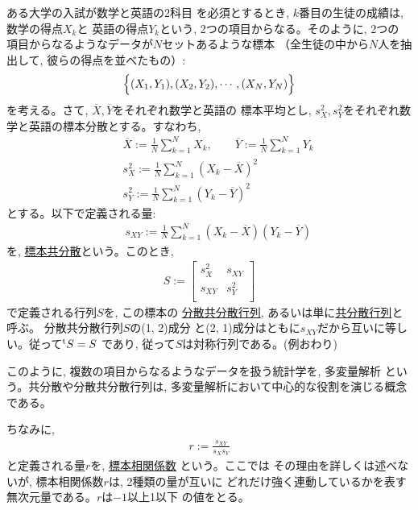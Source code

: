\begin{exmpl} ある大学の入試が数学と英語の2科目
を必須とするとき, $k$番目の生徒の成績は, 数学の得点$X_k$と
英語の得点$Y_k$という, 2つの項目からなる。そのように, 2つの
項目からなるようなデータが$N$セットあるような標本
（全生徒の中から$N$人を抽出して, 彼らの得点を並べたもの）:
\begin{eqnarray}
\Bigl\{
(X_1, Y_1), (X_2, Y_2), \cdots, (X_N, Y_N)
\Bigr\}
\end{eqnarray}
を考える。さて, $\overline{X}, \overline{Y}$をそれぞれ数学と英語の
標本平均とし, $s_{X}^2, s_{Y}^2$をそれぞれ数学と英語の標本分散とする。すなわち, 
\begin{eqnarray}
&&\overline{X}:=\frac{1}{N}\sum_{k=1}^NX_k,\quad\quad\overline{Y}:=\frac{1}{N}\sum_{k=1}^NY_k\nonumber\\
&&s_{X}^2:=\frac{1}{N}\sum_{k=1}^N(X_k-\overline{X})^2\label{eq:def_s2X}\\
&&s_{Y}^2:=\frac{1}{N}\sum_{k=1}^N(Y_k-\overline{Y})^2\label{eq:def_s2Y}
\end{eqnarray}
とする。以下で定義される量:
\begin{eqnarray}
&&s_{XY}:=\frac{1}{N}\sum_{k=1}^N(X_k-\overline{X})(Y_k-\overline{Y})\label{eq:def_sXY}
\end{eqnarray}
を, \underline{標本共分散}という。このとき, 
\begin{eqnarray}
S:=\left[\begin{array}{ccc}
s_{X}^2 & s_{XY}\\
s_{XY}  & s_{Y}^2\\
\end{array}\right]\label{eq:def_covariance_matrix_sample}\end{eqnarray}
で定義される行列$S$を, この標本の
\underline{分散共分散行列}, あるいは単に\underline{共分散行列}と呼ぶ。
分散共分散行列$S$の(1, 2)成分
と(2, 1)成分はともに$s_{XY}$だから互いに等しい。従って$^{\text t}S=S$
であり, 従って$S$は対称行列である。(例おわり)
\end{exmpl}

このように, 複数の項目からなるようなデータを扱う統計学を, 多変量解析
という。共分散や分散共分散行列は, 
多変量解析において中心的な役割を演じる概念である。

ちなみに, 
\begin{eqnarray}
r:=\frac{s_{XY}}{s_X s_Y}\label{eq_def_sample_correlation}
\end{eqnarray}
と定義される量$r$を, \underline{標本相関係数}
という。ここでは
その理由を詳しくは述べないが, 標本相関係数$r$は, 2種類の量が互いに
どれだけ強く連動しているかを表す無次元量である。$r$は$-1$以上1以下
の値をとる。\mv

